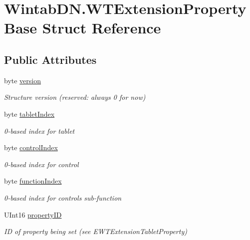 \hypertarget{struct_wintab_d_n_1_1_w_t_extension_property_base}{}\section{Wintab\+D\+N.\+W\+T\+Extension\+Property\+Base Struct Reference}
\label{struct_wintab_d_n_1_1_w_t_extension_property_base}
\subsection*{Public Attributes}
\begin{DoxyCompactItemize}
\item 
byte \mbox{\hyperlink{struct_wintab_d_n_1_1_w_t_extension_property_base_a5fdc109e4467c61bd84874ecac0c6d9f}{version}}
\begin{DoxyCompactList}\small\item\em Structure version (reserved\+: always 0 for now) \end{DoxyCompactList}\item 
byte \mbox{\hyperlink{struct_wintab_d_n_1_1_w_t_extension_property_base_a591a3053ce05b7a56fe2274299deecce}{tablet\+Index}}
\begin{DoxyCompactList}\small\item\em 0-\/based index for tablet \end{DoxyCompactList}\item 
byte \mbox{\hyperlink{struct_wintab_d_n_1_1_w_t_extension_property_base_a8da2af5b03fdae926e703ec56a9fe99b}{control\+Index}}
\begin{DoxyCompactList}\small\item\em 0-\/based index for control \end{DoxyCompactList}\item 
byte \mbox{\hyperlink{struct_wintab_d_n_1_1_w_t_extension_property_base_afe5a7df8bf1825a5d8d005757ca3b7f1}{function\+Index}}
\begin{DoxyCompactList}\small\item\em 0-\/based index for control\textquotesingle{}s sub-\/function \end{DoxyCompactList}\item 
U\+Int16 \mbox{\hyperlink{struct_wintab_d_n_1_1_w_t_extension_property_base_a867ba4c1d0d895398e21dadca6f5cbe6}{property\+ID}}
\begin{DoxyCompactList}\small\item\em ID of property being set (see E\+W\+T\+Extension\+Tablet\+Property) \end{DoxyCompactList}\item 

\end{DoxyCompactItemize}
